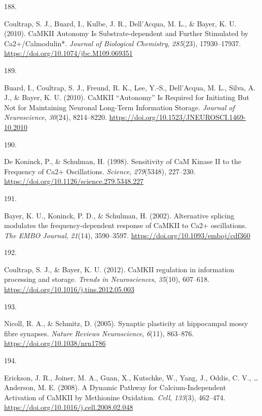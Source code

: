 \documentclass[
  11pt,
  letterpaper,
]{scrreprt}
\newlength{\cslhangindent}
\newlength{\csllabelwidth}
\newenvironment{CSLReferences}[2] %
 {\begin{list}{}{%
  \setlength{\itemindent}{0pt}
  \setlength{\leftmargin}{0pt}
  \setlength{\parsep}{0pt}
  \ifodd #1
   \setlength{\leftmargin}{\cslhangindent}
   \setlength{\itemindent}{-1\cslhangindent}
  \fi
  \setlength{\itemsep}{#2\baselineskip}}}
 {\end{list}}
\newcommand{\CSLLeftMargin}[1]{\parbox[t]{\csllabelwidth}{\strut#1\strut}}
\newcommand{\CSLRightInline}[1]{\parbox[t]{\linewidth - \csllabelwidth}{\strut#1\strut}}
\begin{document}
\begin{CSLReferences}{0}{0}
\CSLLeftMargin{188. }%
\CSLRightInline{Coultrap, S. J., Buard, I., Kulbe, J. R., Dell'Acqua, M.
L., \& Bayer, K. U. (2010). {CaMKII Autonomy Is Substrate-dependent} and
{Further Stimulated} by {Ca2}+/{Calmodulin}*. \emph{Journal of
Biological Chemistry}, \emph{285}(23), 17930--17937.
\url{https://doi.org/10.1074/jbc.M109.069351}}

\CSLLeftMargin{189. }%
\CSLRightInline{Buard, I., Coultrap, S. J., Freund, R. K., Lee, Y.-S.,
Dell'Acqua, M. L., Silva, A. J., \& Bayer, K. U. (2010). {CaMKII}
{``{Autonomy}''} {Is Required} for {Initiating But Not} for {Maintaining
Neuronal Long-Term Information Storage}. \emph{Journal of Neuroscience},
\emph{30}(24), 8214--8220.
\url{https://doi.org/10.1523/JNEUROSCI.1469-10.2010}}

\CSLLeftMargin{190. }%
\CSLRightInline{De Koninck, P., \& Schulman, H. (1998). Sensitivity of
{CaM Kinase II} to the {Frequency} of {Ca2}+ {Oscillations}.
\emph{Science}, \emph{279}(5348), 227--230.
\url{https://doi.org/10.1126/science.279.5348.227}}

\CSLLeftMargin{191. }%
\CSLRightInline{Bayer, K. U., Koninck, P. D., \& Schulman, H. (2002).
Alternative splicing modulates the frequency‐dependent response of
{CaMKII} to {Ca2}+ oscillations. \emph{The EMBO Journal}, \emph{21}(14),
3590--3597. \url{https://doi.org/10.1093/emboj/cdf360}}

\CSLLeftMargin{192. }%
\CSLRightInline{Coultrap, S. J., \& Bayer, K. U. (2012). {CaMKII}
regulation in information processing and storage. \emph{Trends in
Neurosciences}, \emph{35}(10), 607--618.
\url{https://doi.org/10.1016/j.tins.2012.05.003}}

\CSLLeftMargin{193. }%
\CSLRightInline{Nicoll, R. A., \& Schmitz, D. (2005). Synaptic
plasticity at hippocampal mossy fibre synapses. \emph{Nature Reviews
Neuroscience}, \emph{6}(11), 863--876.
\url{https://doi.org/10.1038/nrn1786}}

\CSLLeftMargin{194. }%
\CSLRightInline{Erickson, J. R., Joiner, M. A., Guan, X., Kutschke, W.,
Yang, J., Oddis, C. V., \ldots{} Anderson, M. E. (2008). A {Dynamic
Pathway} for {Calcium-Independent Activation} of {CaMKII} by {Methionine
Oxidation}. \emph{Cell}, \emph{133}(3), 462--474.
\url{https://doi.org/10.1016/j.cell.2008.02.048}}


\end{CSLReferences}
\end{document}
